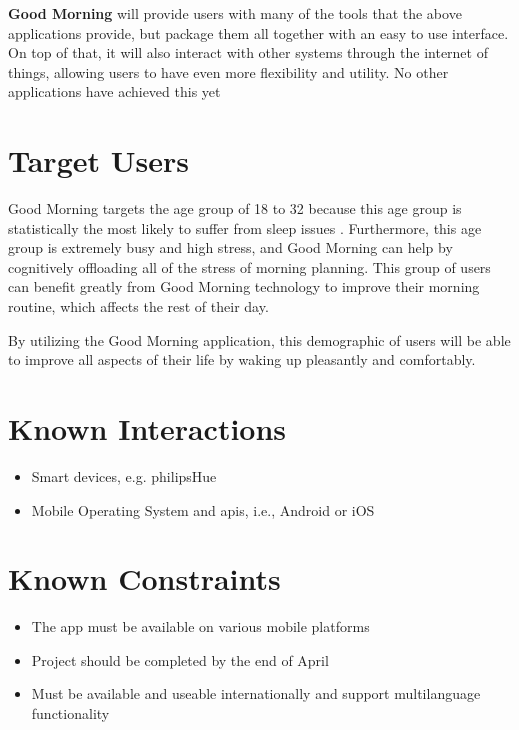 \documentclass[11pt]{article}
\begin{document}
\textbf{Good Morning} will provide users with many of the tools that the above applications
provide, but package them all together with an easy to use interface. On top of that, it will also
interact with other systems through the internet of things, allowing users to have even more flexibility
and utility. No other applications have achieved this yet


%
\section{Target Users}\label{target-users}

Good Morning targets the age group of 18 to 32 because this age group is statistically the most likely to suffer from sleep issues \cite{sleepdisorders}. Furthermore, this age group is extremely busy and high stress, and Good Morning can help by cognitively offloading all of the stress of morning planning. This group of users can benefit greatly from Good Morning technology to improve their morning routine, which affects the rest of their day.

By utilizing the Good Morning application, this demographic of users will be able to improve all aspects of their life by waking up pleasantly and comfortably.

%
\section{Known Interactions}\label{known-interactions}

\begin{itemize}
\item
  Smart devices, e.g. \gls{philipsHue}
\item
  Mobile Operating System and \glspl{api}, i.e., Android or iOS
\end{itemize}


%
\section{Known Constraints}\label{known-constraints}

\begin{itemize}
 \item The app must be available on various mobile platforms
 \item Project should be completed by the end of April
 \item Must be available and useable internationally and support multilanguage functionality
 
\end{itemize}
\end{document}
